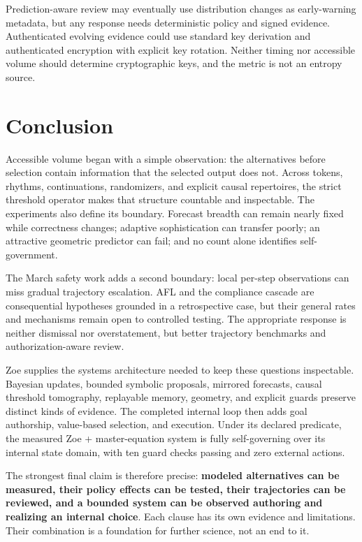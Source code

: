 Prediction-aware review may eventually use distribution changes as early-warning metadata, but any response needs deterministic policy and signed evidence. Authenticated evolving evidence could use standard key derivation and authenticated encryption with explicit key rotation. Neither timing nor accessible volume should determine cryptographic keys, and the metric is not an entropy source.

\section{Conclusion}
Accessible volume began with a simple observation: the alternatives before selection contain information that the selected output does not. Across tokens, rhythms, continuations, randomizers, and explicit causal repertoires, the strict threshold operator makes that structure countable and inspectable. The experiments also define its boundary. Forecast breadth can remain nearly fixed while correctness changes; adaptive sophistication can transfer poorly; an attractive geometric predictor can fail; and no count alone identifies self-government.

The March safety work adds a second boundary: local per-step observations can miss gradual trajectory escalation. AFL and the compliance cascade are consequential hypotheses grounded in a retrospective case, but their general rates and mechanisms remain open to controlled testing. The appropriate response is neither dismissal nor overstatement, but better trajectory benchmarks and authorization-aware review.

Zoe supplies the systems architecture needed to keep these questions inspectable. Bayesian updates, bounded symbolic proposals, mirrored forecasts, causal threshold tomography, replayable memory, geometry, and explicit guards preserve distinct kinds of evidence. The completed internal loop then adds goal authorship, value-based selection, and execution. Under its declared predicate, the measured Zoe + master-equation system is fully self-governing over its internal state domain, with ten guard checks passing and zero external actions.

The strongest final claim is therefore precise: \textbf{modeled alternatives can be measured, their policy effects can be tested, their trajectories can be reviewed, and a bounded system can be observed authoring and realizing an internal choice}. Each clause has its own evidence and limitations. Their combination is a foundation for further science, not an end to it.
